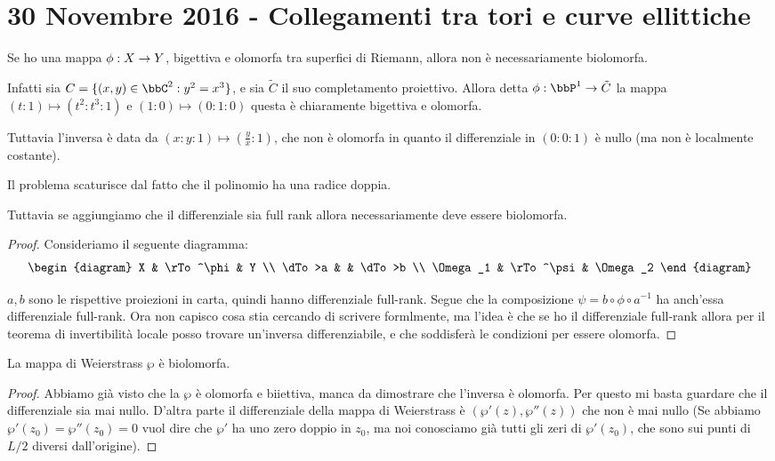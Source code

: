 \chapter{30 Novembre 2016 - Collegamenti tra tori e curve ellittiche}
	Se ho una mappa $\phi: X \rightarrow Y$, bigettiva e olomorfa tra superfici di Riemann, allora non è necessariamente biolomorfa.
	
	Infatti sia $C = \{ (x,y) \in \bbC^2 : y^2=x^3 \}$, e sia $\tilde C$ il suo completamento proiettivo. Allora detta $\phi: \bbP^1 \rar \tilde C$ la mappa $ (t : 1) \mapsto (t^2 : t^3 : 1)$ e $(1 : 0) \mapsto (0:1:0)$ questa è chiaramente bigettiva e olomorfa.

	Tuttavia l'inversa è data da $(x:y:1) \mapsto (\frac yx:1)$, che non è olomorfa in quanto il differenziale in $(0:0:1)$ è nullo (ma non è localmente costante).
	
	Il problema scaturisce dal fatto che il polinomio ha una radice doppia.
	
	Tuttavia se aggiungiamo che il differenziale sia full rank allora necessariamente deve essere biolomorfa.
	\begin{proof}
		Consideriamo il seguente diagramma:
		\[
		\begin{diagram}
			X & \rTo^\phi & Y \\
			\dTo>a & & \dTo>b \\
			\Omega_1 & \rTo^\psi & \Omega_2
		\end{diagram}
		\]
		
		$a, b$ sono le rispettive proiezioni in carta, quindi hanno differenziale full-rank. Segue che la composizione $\psi = b\circ \phi \circ a^{-1}$ ha anch'essa differenziale full-rank.
		Ora non capisco cosa stia cercando di scrivere formlmente, ma l'idea è che se ho il differenziale full-rank allora per il teorema di invertibilità locale posso trovare un'inversa differenziabile, e che soddisferà le condizioni per essere olomorfa. %
	\end{proof}

	\begin{proposizione}
		La mappa di Weierstrass $\wp$ è biolomorfa. 
	\end{proposizione}
	\begin{proof}
		Abbiamo già visto che la $\wp$ è olomorfa e biiettiva, manca da dimostrare che l'inversa è olomorfa.
		Per questo mi basta guardare che il differenziale sia mai nullo. D'altra parte il differenziale della mappa di Weierstrass è $ (\wp'(z), \wp''(z))$ che non è mai nullo (Se abbiamo $\wp'(z_0) = \wp''(z_0) = 0$ vuol dire che $\wp'$ ha uno zero doppio in $z_0$, ma noi conosciamo già tutti gli zeri di $\wp'(z_0)$, che sono sui punti di $L/2$ diversi dall'origine).
	\end{proof}
	
